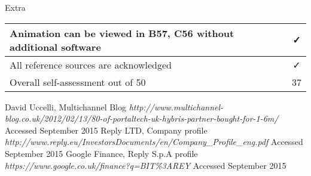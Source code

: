 \documentclass[titlepage]{article}
\begin{document}
        Extra \\
        \vspace{1em}
        \begin{tabularx}{\columnwidth}{| X | c |}
            \hline
            Animation can be viewed in B57, C56 without additional software & ✓ \\
            \hline
            All reference sources are acknowledged & ✓ \\
            \hline
            Overall self-assessment out of 50 & 37 \\
            \hline
        \end{tabularx}


 \begin{thebibliography}{1}
 	
 	 David Uccelli, Multichannel Blog {\em http://www.multichannel-blog.co.uk/2012/02/13/80-of-portaltech-uk-hybris-partner-bought-for-1-6m/} Accessed September 2015
 	 Reply LTD, Company profile {\em http://www.reply.eu/InvestorsDocuments/en/Company\_Profile\_eng.pdf} Accessed September 2015
 	 Google Finance, Reply S.p.A profile {\em https://www.google.co.uk/finance?q=BIT\%3AREY} Accessed September 2015
 	
 	
 	
 	
 		

	


 \end{thebibliography}
\end{document}
